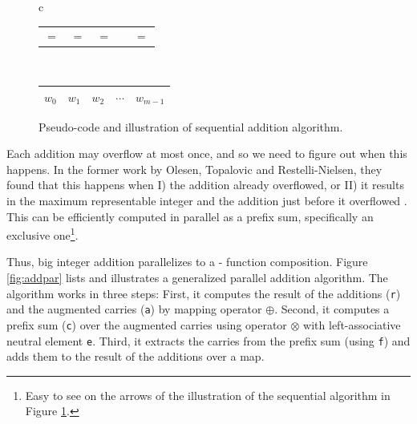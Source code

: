 \begin{figure}
\begin{minipage}{0.45\textwidth}
\begin{tabular}{c}
      \begin{tabular}{C{0.7cm}C{0.7cm}C{0.8cm}C{0.7cm}C{0.7cm}}
        $=$ & $=$ & $=$ &  & $=$  
      \end{tabular}\\
      \begin{tabular}{|C{0.7cm}|C{0.7cm}|C{0.7cm}|C{0.7cm}|C{0.7cm}|}
        \hline
        $w_{0}$ & $w_1$ & $w_2$ & $\cdots$ & $w_{m-1}$\\
        \hline
      \end{tabular}
    \end{tabular}
  \end{minipage}
  \caption{Pseudo-code and illustration of sequential addition algorithm.}
  \label{fig:addseq}
\end{figure}

Each addition may overflow at most once, and so we need to figure out when this
happens. In the former work by Olesen, Topalovic and Restelli-Nielsen, they
found that this happens when I) the addition already overflowed, or II) it
results in the maximum representable integer and the addition just before it
overflowed \cite{DPPproject}. This can be efficiently computed in parallel as a
prefix sum, specifically an exclusive one\footnote{Easy to see on the arrows of
  the illustration of the sequential algorithm in Figure \ref{fig:addseq}.}.

Thus, big integer addition parallelizes to a - function
composition. Figure \ref{fig:addpar} lists and illustrates a generalized
parallel addition algorithm. The algorithm works in three steps: First, it
computes the result of the additions (\texttt{r}) and the augmented carries
(\texttt{a}) by mapping operator $\oplus$. Second, it computes a prefix sum
(\texttt{c}) over the augmented carries using operator $\otimes$ with left-associative
neutral element \texttt{e}. Third, it extracts the carries from the prefix sum
(using \texttt{f}) and adds them to the result of the additions over a map.

